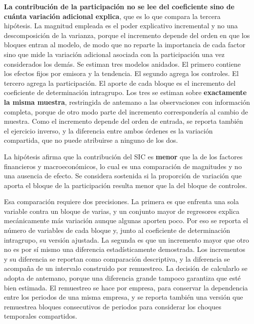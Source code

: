 \textbf{La contribución de la participación no se lee del coeficiente sino de cuánta variación adicional explica}, que es lo que compara la tercera hipótesis. La magnitud empleada es el poder explicativo incremental y no una descomposición de la varianza, porque el incremento depende del orden en que los bloques entran al modelo, de modo que no reparte la importancia de cada factor sino que mide la variación adicional asociada con la participación una vez considerados los demás. Se estiman tres modelos anidados. El primero contiene los efectos fijos por emisora y la tendencia. El segundo agrega los controles. El tercero agrega la participación. El aporte de cada bloque es el incremento del coeficiente de determinación intragrupo. Los tres se estiman sobre \textbf{exactamente la misma muestra}, restringida de antemano a las observaciones con información completa, porque de otro modo parte del incremento correspondería al cambio de muestra. Como el incremento depende del orden de entrada, se reporta también el ejercicio inverso, y la diferencia entre ambos órdenes es la variación compartida, que no puede atribuirse a ninguno de los dos.

La hipótesis afirma que la contribución del SIC es \textbf{menor} que la de los factores financieros y macroeconómicos, lo cual es una comparación de magnitudes y no una ausencia de efecto. Se considera sostenida si la proporción de variación que aporta el bloque de la participación resulta menor que la del bloque de controles.

Esa comparación requiere dos precisiones. La primera es que enfrenta una sola variable contra un bloque de varias, y un conjunto mayor de regresores explica mecánicamente más variación aunque algunas aporten poco. Por eso se reporta el número de variables de cada bloque y, junto al coeficiente de determinación intragrupo, su versión ajustada. La segunda es que un incremento mayor que otro no es por sí mismo una diferencia estadísticamente demostrada. Los incrementos y su diferencia se reportan como comparación descriptiva, y la diferencia se acompaña de un intervalo construido por remuestreo. La decisión de calcularlo se adopta de antemano, porque una diferencia grande tampoco garantiza que esté bien estimada. El remuestreo se hace por empresa, para conservar la dependencia entre los periodos de una misma empresa, y se reporta también una versión que remuestrea bloques consecutivos de periodos para considerar los choques temporales compartidos.


